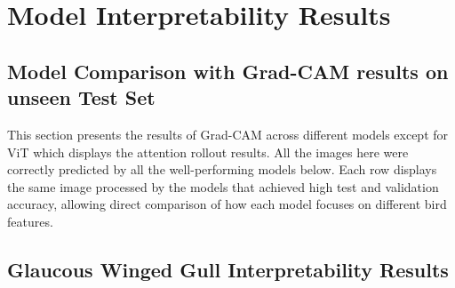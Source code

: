 \documentclass[a4paper,12pt]{report}
\begin{document}
\section{Model Interpretability Results}
\label{sec:interpretability}

\subsection{Model Comparison with Grad-CAM results on unseen Test Set}
This section presents the results of Grad-CAM across different models except for ViT which displays the attention rollout results. All the images here were correctly predicted by all the well-performing models below. Each row displays the same image processed by the models that achieved high test and validation accuracy, allowing direct comparison of how each model focuses on different bird features.

\subsection{Glaucous Winged Gull Interpretability Results}
\label{subsec:glaucous_interpretability}
\end{document}
